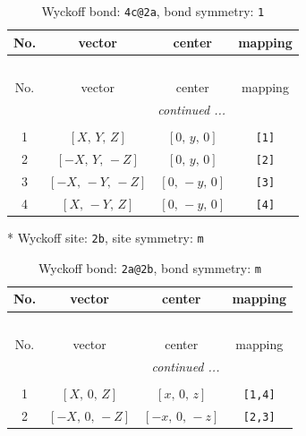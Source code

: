 \documentclass[fleqn,8pt]{jsarticle}
\begin{document}
\renewcommand{\arraystretch}{1.2}
\begin{longtable}{cccc}
\caption{Wyckoff bond: {\tt 4c@2a}, bond symmetry: {\tt 1}}
 \\
 \hline \hline
No. & vector & center & mapping \\ \hline \endfirsthead

\multicolumn{3}{l}{\tablename\ \thetable{}} \\
 \hline \hline
No. & vector & center & mapping \\ \hline \endhead

 \hline \hline
\multicolumn{3}{r}{\footnotesize\it continued ...} \\ \endfoot

 \hline \hline
\multicolumn{3}{r}{} \\ \endlastfoot

1 & $\left[ X,\, Y,\, Z \right]$ & $\left[ 0,\, y,\, 0 \right]$ & {\tt [1]} \\ \hline
2 & $\left[ - X,\, Y,\, - Z \right]$ & $\left[ 0,\, y,\, 0 \right]$ & {\tt [2]} \\ \hline
3 & $\left[ - X,\, - Y,\, - Z \right]$ & $\left[ 0,\, - y,\, 0 \right]$ & {\tt [3]} \\ \hline
4 & $\left[ X,\, - Y,\, Z \right]$ & $\left[ 0,\, - y,\, 0 \right]$ & {\tt [4]} \\
\end{longtable}
* Wyckoff site: {\tt 2b}, site symmetry: {\tt m}
\renewcommand{\arraystretch}{1.2}
\begin{longtable}{cccc}
\caption{Wyckoff bond: {\tt 2a@2b}, bond symmetry: {\tt m}}
 \\
 \hline \hline
No. & vector & center & mapping \\ \hline \endfirsthead

\multicolumn{3}{l}{\tablename\ \thetable{}} \\
 \hline \hline
No. & vector & center & mapping \\ \hline \endhead

 \hline \hline
\multicolumn{3}{r}{\footnotesize\it continued ...} \\ \endfoot

 \hline \hline
\multicolumn{3}{r}{} \\ \endlastfoot

1 & $\left[ X,\, 0,\, Z \right]$ & $\left[ x,\, 0,\, z \right]$ & {\tt [1,4]} \\ \hline
2 & $\left[ - X,\, 0,\, - Z \right]$ & $\left[ - x,\, 0,\, - z \right]$ & {\tt [2,3]} \\
\end{longtable}
\end{document}
